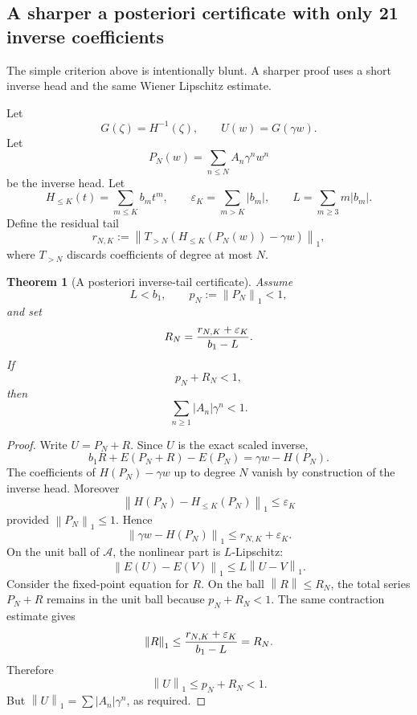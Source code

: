 \documentclass[11pt]{article}
\newtheorem{theorem}{Theorem}[section]
\newcommand{\1}{\mathbf{1}}
\newcommand{\eps}{\varepsilon}
\newcommand{\norm}[1]{\left\lVert #1\right\rVert}
\newcommand{\abs}[1]{\left\lvert #1\right\rvert}
\begin{document}
\subsection{A sharper a posteriori certificate with only 21 inverse coefficients}

The simple criterion above is intentionally blunt.  A sharper proof uses a short inverse head and the same Wiener Lipschitz estimate.

Let
\[
        G(\zeta)=H^{-1}(\zeta),
        \qquad
        U(w)=G(\gamma w).
\]
Let
\[
        P_N(w)=\sum_{n\le N}A_n\gamma^n w^n
\]
be the inverse head.  Let
\[
        H_{\le K}(t)=\sum_{m\le K}b_mt^m,
        \qquad
        \eps_K=\sum_{m>K}\abs{b_m},
        \qquad
        L=\sum_{m\ge3}m\abs{b_m}.
\]
Define the residual tail
\begin{equation}\label{eq:residual-tail}
        r_{N,K}:=\norm{T_{>N}\left(H_{\le K}(P_N(w))-\gamma w\right)}_1,
\end{equation}
where \(T_{>N}\) discards coefficients of degree at most \(N\).

\begin{theorem}[A posteriori inverse-tail certificate]\label{thm:aposteriori}
Assume
\[
        L<b_1,
        \qquad
        p_N:=\norm{P_N}_1<1,
\]
and set
\begin{equation}\label{eq:R-bound}
        R_N={r_{N,K}+\eps_K\over b_1-L}.
\end{equation}
If
\[
        p_N+R_N<1,
\]
then
\[
        \sum_{n\ge1}\abs{A_n}\gamma^n<1.
\]
\end{theorem}

\begin{proof}
Write \(U=P_N+R\).  Since \(U\) is the exact scaled inverse,
\[
        b_1R+E(P_N+R)-E(P_N)
        =\gamma w-H(P_N).
\]
The coefficients of \(H(P_N)-\gamma w\) up to degree \(N\) vanish by construction of the inverse head.  Moreover
\[
        \norm{H(P_N)-H_{\le K}(P_N)}_1\le \eps_K
\]
provided \(\norm{P_N}_1\le1\).  Hence
\[
        \norm{\gamma w-H(P_N)}_1\le r_{N,K}+\eps_K.
\]
On the unit ball of \(\mathcal A\), the nonlinear part is \(L\)-Lipschitz:
\[
        \norm{E(U)-E(V)}_1\le L\norm{U-V}_1.
\]
Consider the fixed-point equation for \(R\).  On the ball \(\norm{R}\le R_N\), the total series \(P_N+R\) remains in the unit ball because \(p_N+R_N<1\).  The same contraction estimate gives
\[
        \norm{R}_1\le {r_{N,K}+\eps_K\over b_1-L}=R_N.
\]
Therefore
\[
        \norm{U}_1\le p_N+R_N<1.
\]
But \(\norm{U}_1=\sum\abs{A_n}\gamma^n\), as required.
\end{proof}
\end{document}
